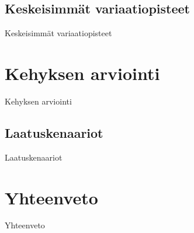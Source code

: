 \documentclass[finnish]{tktltiki2}
\theoremstyle{definition}
\theoremstyle{remark}
\numberwithin{figure}{section}
\begin{document}
\subsection{Keskeisimmät variaatiopisteet}

Keskeisimmät variaatiopisteet

\section{Kehyksen arviointi}

Kehyksen arviointi

\subsection{Laatuskenaariot}

Laatuskenaariot
\cite{GameTestingAllInOne2005}

\section{Yhteenveto}

Yhteenveto





%
%
% 
%


%

\renewcommand{\BRetrieved}[1]{Tarkistettu {#1}, saatavilla\ }
\renewcommand{\BRetrievedFrom}{Tarkistettu saatavilla\ }




% 
\end{document}
